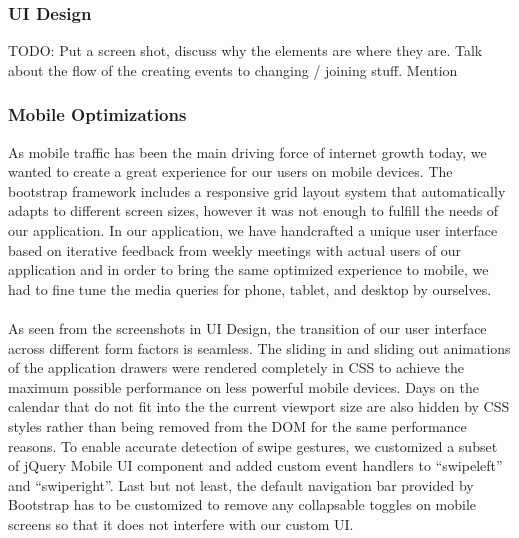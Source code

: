 \documentclass[10pt,a4paper]{article}
\begin{document}
\subsubsection{UI Design}
TODO: Put a screen shot, discuss why the elements are where they are. Talk about 
the flow of the creating events to changing / joining stuff. Mention

\subsubsection{Mobile Optimizations}
As mobile traffic has been the main driving force of internet growth today, we wanted to create a great experience for our users on mobile devices. The bootstrap framework includes a responsive grid layout system that automatically adapts to different screen sizes, however it was not enough to fulfill the needs of our application. In our application, we have handcrafted a unique user interface based on iterative feedback from weekly meetings with actual users of our application and in order to bring the same optimized experience to mobile, we had to fine tune the media queries for phone, tablet, and desktop by ourselves.
\\
\\
\noindent As seen from the screenshots in UI Design, the transition of our user interface across different form factors is seamless. The sliding in and sliding out animations of the application drawers were rendered completely in CSS to achieve the maximum possible performance on less powerful mobile devices. Days on the calendar that do not fit into the the current viewport size are also hidden by CSS styles rather than being removed from the DOM for the same performance reasons. To enable accurate detection of swipe gestures, we customized a subset of jQuery Mobile UI component and added custom event handlers to “swipeleft” and “swiperight”. Last but not least, the default navigation bar provided by Bootstrap has to be customized to remove any collapsable toggles on mobile screens so that it does not interfere with our custom UI.
\end{document}
